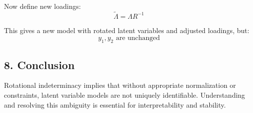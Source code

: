 \documentclass[12pt,a4paper]{article}
\begin{document}
Now define new loadings:
\[
\tilde{\Lambda} = \Lambda R^{-1}
\]

This gives a new model with rotated latent variables and adjusted loadings, but:
\[
y_1, y_2 \text{ are unchanged}
\]

\subsection{8. Conclusion}

Rotational indeterminacy implies that without appropriate normalization or constraints, latent variable models are not uniquely identifiable. Understanding and resolving this ambiguity is essential for interpretability and stability.


\clearpage


\end{document}
